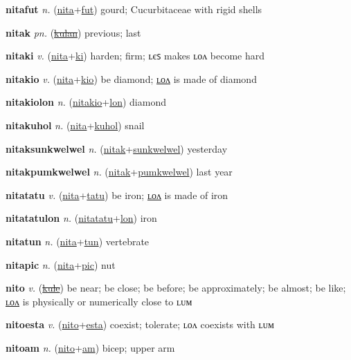 \textbf{\hypertarget{nitafut}{nitafut}} \textit{n.} (\hyperlink{nita}{nita}+\allowbreak \hyperlink{fut}{fut})
gourd; Cucurbitaceae with rigid shells

\textbf{\hypertarget{nitak}{nitak}} \textit{pn.} (\hyperlink{kulan}{\sout{kulan}})
previous; last

\textbf{\hypertarget{nitaki}{nitaki}} \textit{v.} (\hyperlink{nita}{nita}+\allowbreak \hyperlink{ki}{ki})
harden; firm; ʟєꜱ makes ʟᴏᴧ become hard

\textbf{\hypertarget{nitakio}{nitakio}} \textit{v.} (\hyperlink{nita}{nita}+\allowbreak \hyperlink{kio}{kio})
be diamond; \hyperlink{nitakiolon}{ʟᴏᴧ} is made of diamond

\textbf{\hypertarget{nitakiolon}{nitakiolon}} \textit{n.} (\hyperlink{nitakio}{nitakio}+\allowbreak \hyperlink{lon}{lon})
diamond

\textbf{\hypertarget{nitakuhol}{nitakuhol}} \textit{n.} (\hyperlink{nita}{nita}+\allowbreak \hyperlink{kuhol}{kuhol})
snail

\textbf{\hypertarget{nitaksunkwelwel}{nitaksunkwelwel}} \textit{n.} (\hyperlink{nitak}{nitak}+\allowbreak \hyperlink{sunkwelwel}{sunkwelwel})
yesterday

\textbf{\hypertarget{nitakpumkwelwel}{nitakpumkwelwel}} \textit{n.} (\hyperlink{nitak}{nitak}+\allowbreak \hyperlink{pumkwelwel}{pumkwelwel})
last year

\textbf{\hypertarget{nitatatu}{nitatatu}} \textit{v.} (\hyperlink{nita}{nita}+\allowbreak \hyperlink{tatu}{tatu})
be iron; \hyperlink{nitatatulon}{ʟᴏᴧ} is made of iron

\textbf{\hypertarget{nitatatulon}{nitatatulon}} \textit{n.} (\hyperlink{nitatatu}{nitatatu}+\allowbreak \hyperlink{lon}{lon})
iron

\textbf{\hypertarget{nitatun}{nitatun}} \textit{n.} (\hyperlink{nita}{nita}+\allowbreak \hyperlink{tun}{tun})
vertebrate

\textbf{\hypertarget{nitapic}{nitapic}} \textit{n.} (\hyperlink{nita}{nita}+\allowbreak \hyperlink{pic}{pic})
nut

\textbf{\hypertarget{nito}{nito}} \textit{v.} (\hyperlink{kule}{\sout{kule}})
be near; be close; be before; be approximately; be almost; be like; \hyperlink{nitolon}{ʟᴏᴧ} is physically or numerically close to ʟᴜᴍ

\textbf{\hypertarget{nitoesta}{nitoesta}} \textit{v.} (\hyperlink{nito}{nito}+\allowbreak \hyperlink{esta}{esta})
coexist; tolerate; ʟᴏᴧ coexists with ʟᴜᴍ

\textbf{\hypertarget{nitoam}{nitoam}} \textit{n.} (\hyperlink{nito}{nito}+\allowbreak \hyperlink{am}{am})
bicep; upper arm

